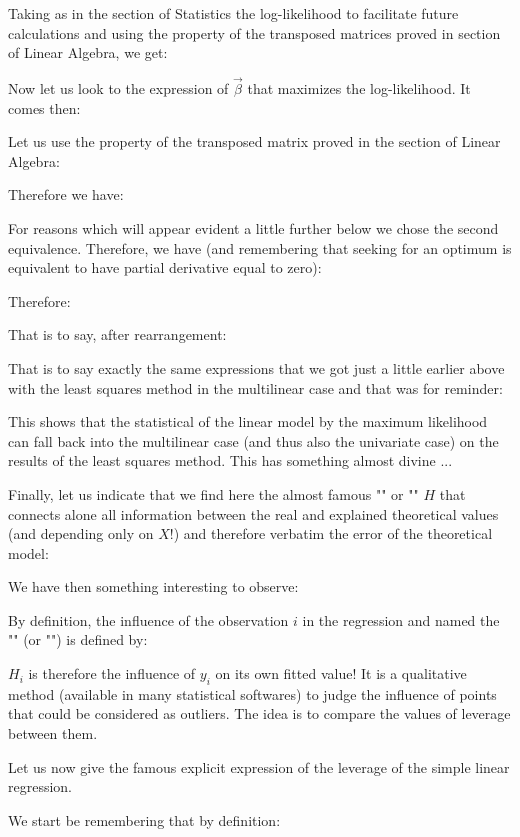 	Taking as in the section of Statistics the log-likelihood to facilitate future calculations and using the property of the transposed matrices proved in section of Linear Algebra, we get:
	
	Now let us look to the expression of $\vec{\beta}$ that maximizes the log-likelihood. It comes then:
	
	Let us use the property of the transposed matrix proved in the section of Linear Algebra:
	
	Therefore we have:
	
	For reasons which will appear evident a little further below we chose the second equivalence. Therefore, we have (and remembering that seeking for an optimum is equivalent to have partial derivative equal to zero):
	
	Therefore:
	
	That is to say, after rearrangement:
	
	That is to say exactly the same expressions that we got just a little earlier above with the least squares method in the multilinear case and that was for reminder:
	
	This shows that the statistical of the linear model by the maximum likelihood can fall back into the multilinear case (and thus also the univariate case) on the results of the least squares method. This has something almost divine ...
	
	Finally, let us indicate that we find here the almost famous "" or "" $H$ that connects alone all information between the real and explained theoretical values (and depending only on $X$!) and therefore verbatim the error of the theoretical model:
	
	We have then something interesting to observe:
	
	By definition, the influence of the observation $i$ in the regression and named the  "" (or "") is defined by:
	
	$H_i$ is therefore the influence of $y_i$ on its own fitted value! It is a qualitative method (available in many statistical softwares) to judge the influence of points that could be considered as outliers. The idea is to compare the values of leverage between them.
	
	Let us now give the famous explicit expression of the leverage of the simple linear regression.

	We start be remembering that by definition:
	
